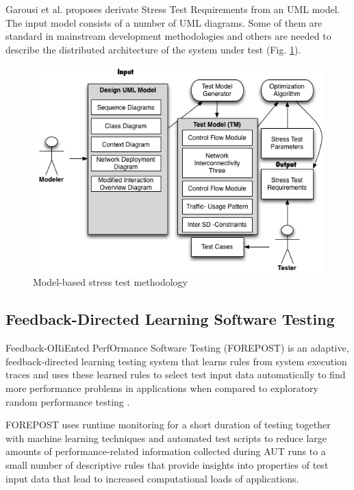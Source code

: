 Garousi et al. proposes derivate Stress Test Requirements from an UML model. The input model consists of a number of UML diagrams. Some of
them are standard in mainstream development methodologies and others are needed to describe the distributed architecture of the system under test (Fig. \ref{fig:modelbased}).

\begin{figure}[!ht]
\centering
\includegraphics[width=1\textwidth]{./images/modelmethodology.png}
\caption{Model-based stress test methodology}
\label{fig:modelbased}
\end{figure}

\subsection{Feedback-Directed Learning Software Testing}

Feedback-ORiEnted PerfOrmance Software Testing (FOREPOST) is an adaptive, feedback-directed learning testing system that learns rules from system execution traces and uses these learned rules to select test input data automatically to find more performance problems in applications when compared to exploratory random performance testing \cite{Grechanik2012}.

FOREPOST uses runtime monitoring for a short duration of testing together with machine learning techniques and automated test scripts to reduce large amounts of performance-related information collected during AUT runs to a small number of descriptive rules that provide insights into properties of test input data that lead to increased computational loads of applications.


